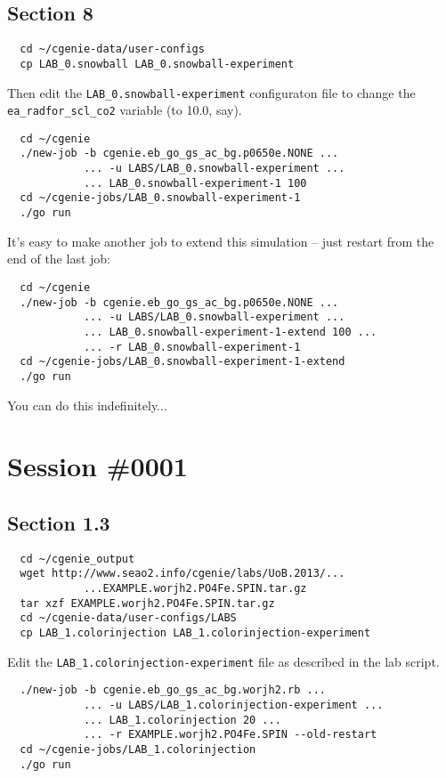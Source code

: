 \documentclass[a4paper,10pt,article]{memoir}
\begin{document}
\subsection*{Section 8}

\begin{verbatim}
  cd ~/cgenie-data/user-configs
  cp LAB_0.snowball LAB_0.snowball-experiment
\end{verbatim}

Then edit the \texttt{LAB\_0.snowball-experiment} configuraton file to
change the \texttt{ea\_radfor\_scl\_co2} variable (to 10.0, say).

\begin{verbatim}
  cd ~/cgenie
  ./new-job -b cgenie.eb_go_gs_ac_bg.p0650e.NONE ...
            ... -u LABS/LAB_0.snowball-experiment ...
            ... LAB_0.snowball-experiment-1 100
  cd ~/cgenie-jobs/LAB_0.snowball-experiment-1
  ./go run
\end{verbatim}

It's easy to make another job to extend this simulation -- just
restart from the end of the last job:
\begin{verbatim}
  cd ~/cgenie
  ./new-job -b cgenie.eb_go_gs_ac_bg.p0650e.NONE ...
            ... -u LABS/LAB_0.snowball-experiment ...
            ... LAB_0.snowball-experiment-1-extend 100 ...
            ... -r LAB_0.snowball-experiment-1
  cd ~/cgenie-jobs/LAB_0.snowball-experiment-1-extend
  ./go run
\end{verbatim}
You can do this indefinitely...

\section{Session \#0001}

\subsection*{Section 1.3}

\begin{verbatim}
  cd ~/cgenie_output
  wget http://www.seao2.info/cgenie/labs/UoB.2013/...
            ...EXAMPLE.worjh2.PO4Fe.SPIN.tar.gz
  tar xzf EXAMPLE.worjh2.PO4Fe.SPIN.tar.gz
  cd ~/cgenie-data/user-configs/LABS
  cp LAB_1.colorinjection LAB_1.colorinjection-experiment
\end{verbatim}

Edit the \texttt{LAB\_1.colorinjection-experiment} file as described
in the lab script.

\begin{verbatim}
  ./new-job -b cgenie.eb_go_gs_ac_bg.worjh2.rb ...
            ... -u LABS/LAB_1.colorinjection-experiment ...
            ... LAB_1.colorinjection 20 ...
            ... -r EXAMPLE.worjh2.PO4Fe.SPIN --old-restart
  cd ~/cgenie-jobs/LAB_1.colorinjection
  ./go run
\end{verbatim}
\end{document}
